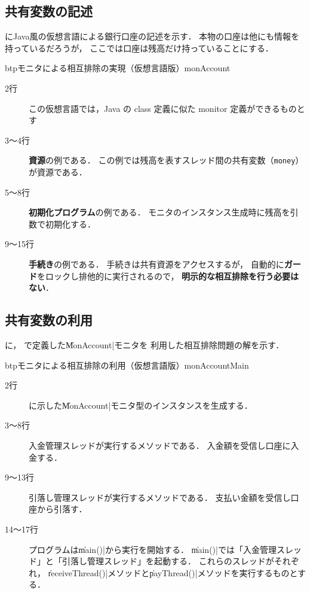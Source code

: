 \subsection{共有変数の記述}
にJava風の仮想言語による銀行口座の記述を示す．
本物の口座は他にも情報を持っているだろうが，
ここでは口座は残高だけ持っていることにする．

\begin{myfig}{btp}{モニタによる相互排除の実現（仮想言語版）}{monAccount}

\end{myfig}

\begin{description}
\item [2行]
この仮想言語では，Java の class 定義に似た monitor 定義ができるものとす

\item [3〜4行]
{\bf 資源}の例である．
この例では残高を表すスレッド間の共有変数（{\tt money}）が資源である．

\item [5〜8行]
{\bf 初期化プログラム}の例である．
モニタのインスタンス生成時に残高を引数で初期化する．

\item [9〜15行]
{\bf 手続き}の例である．
手続きは共有資源をアクセスするが，
自動的に{\bf ガード}をロックし排他的に実行されるので，
{\bf 明示的な相互排除を行う必要はない}．
\end{description}

\subsection{共有変数の利用}
に，
で定義した\|MonAccount|モニタを
利用した相互排除問題の解を示す．

\begin{myfig}{btp}{モニタによる相互排除の利用（仮想言語版）}{monAccountMain}

\end{myfig}

\begin{description}
\item [2行]
に示した\|MonAccount|モニタ型のインスタンスを生成する．

\item [3〜8行]
入金管理スレッドが実行するメソッドである．
入金額を受信し口座に入金する．

\item [9〜13行]
引落し管理スレッドが実行するメソッドである．
支払い金額を受信し口座から引落す．

\item [14〜17行]
プログラムは\|main()|から実行を開始する．
\|main()|では「入金管理スレッド」と「引落し管理スレッド」を起動する．
これらのスレッドがそれぞれ，
\|receiveThread()|メソッドと\|payThread()|メソッドを実行するものとする．
\end{description}

